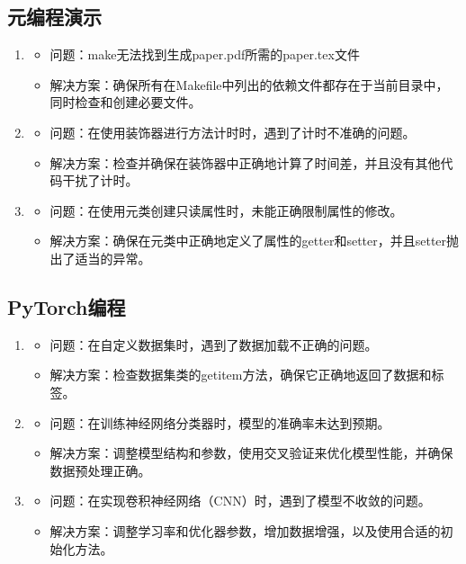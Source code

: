 \documentclass[UTF8]{ctexart}
\begin{document}
\subsection{元编程演示}
 \begin{enumerate} 
\item 
\begin{itemize} 
\item 问题：make无法找到生成paper.pdf所需的paper.tex文件
\item 解决方案：确保所有在Makefile中列出的依赖文件都存在于当前目录中，同时检查和创建必要文件。
 \end{itemize} 
\item \begin{itemize}
\item 问题：在使用装饰器进行方法计时时，遇到了计时不准确的问题。
\item 解决方案：检查并确保在装饰器中正确地计算了时间差，并且没有其他代码干扰了计时。
\end{itemize}
\item \begin{itemize}
\item 问题：在使用元类创建只读属性时，未能正确限制属性的修改。
\item 解决方案：确保在元类中正确地定义了属性的getter和setter，并且setter抛出了适当的异常。
\end{itemize}
\end{enumerate}





\subsection{PyTorch编程}

\begin{enumerate} 
\item \begin{itemize}
\item 问题：在自定义数据集时，遇到了数据加载不正确的问题。
\item 解决方案：检查数据集类的getitem方法，确保它正确地返回了数据和标签。
\end{itemize}
\item \begin{itemize}
\item 问题：在训练神经网络分类器时，模型的准确率未达到预期。
\item 解决方案：调整模型结构和参数，使用交叉验证来优化模型性能，并确保数据预处理正确。
\end{itemize}
\item \begin{itemize}
\item 问题：在实现卷积神经网络（CNN）时，遇到了模型不收敛的问题。
\item 解决方案：调整学习率和优化器参数，增加数据增强，以及使用合适的初始化方法。
\end{itemize}
 \end{enumerate}
\end{document}
